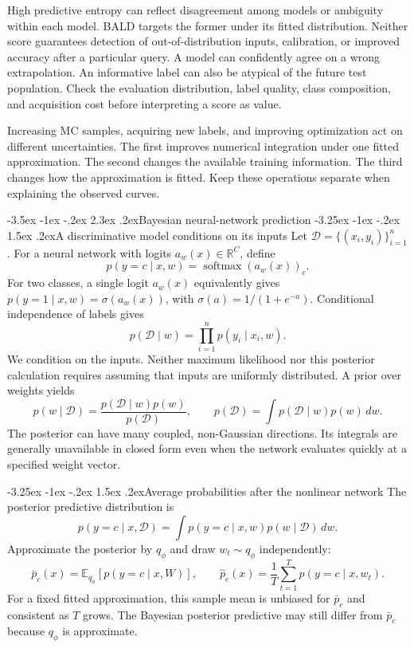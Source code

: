 \documentclass[11pt,a4paper]{article}
\makeatletter
\newcommand{\E}{\mathbb E}
\newcommand{\R}{\mathbb R}
\newcommand{\dd}{\,d}
\renewcommand\section{\@startsection{section}{1}{\z@}%
  {-3.5ex \@plus -1ex \@minus -.2ex}%
  {2.3ex \@plus .2ex}{\normalfont\Large}}
\renewcommand\subsection{\@startsection{subsection}{2}{\z@}%
  {-3.25ex \@plus -1ex \@minus -.2ex}%
  {1.5ex \@plus .2ex}{\normalfont\large}}
\makeatother
\begin{document}
High predictive entropy can reflect disagreement among models or ambiguity
within each model. BALD targets the former under its fitted distribution.
Neither score guarantees detection of out-of-distribution inputs, calibration,
or improved accuracy after a particular query. A model can confidently agree
on a wrong extrapolation. An informative label can also be atypical of the
future test population. Check the evaluation distribution, label quality,
class composition, and acquisition cost before interpreting a score as value.

Increasing MC samples, acquiring new labels, and improving optimization act
on different uncertainties. The first improves numerical integration under
one fitted approximation. The second changes the available training
information. The third changes how the approximation is fitted. Keep these
operations separate when explaining the observed curves.

\section{Bayesian neural-network prediction}
\subsection{A discriminative model conditions on its inputs}
Let $\mathcal D=\{(x_i,y_i)\}_{i=1}^n$. For a neural network with logits
$a_w(x)\in\R^C$, define
\[
 p(y=c\mid x,w)=\operatorname{softmax}(a_w(x))_c.
\]
For two classes, a single logit $a_w(x)$ equivalently gives
$p(y=1\mid x,w)=\sigma(a_w(x))$, with
$\sigma(a)=1/(1+e^{-a})$. Conditional independence of labels gives
\[
 p(\mathcal D\mid w)=\prod_{i=1}^n p(y_i\mid x_i,w).
\]
We condition on the inputs. Neither maximum likelihood nor this posterior
calculation requires assuming that inputs are uniformly distributed.
A prior over weights yields
\[
 p(w\mid\mathcal D)=\frac{p(\mathcal D\mid w)p(w)}{p(\mathcal D)},
 \qquad p(\mathcal D)=\int p(\mathcal D\mid w)p(w)\dd w.
\]
The posterior can have many coupled, non-Gaussian directions. Its integrals
are generally unavailable in closed form even when the network evaluates
quickly at a specified weight vector.

\subsection{Average probabilities after the nonlinear network}
The posterior predictive distribution is
\[
 p(y=c\mid x,\mathcal D)=\int p(y=c\mid x,w)p(w\mid\mathcal D)\dd w.
\]
Approximate the posterior by $q_\phi$ and draw $w_t\sim q_\phi$ independently:
\[
 \bar p_c(x)=\E_{q_\phi}[p(y=c\mid x,W)],\qquad
 \widehat p_c(x)=\frac1T\sum_{t=1}^T p(y=c\mid x,w_t).
\]
For a fixed fitted approximation, this sample mean is unbiased for $\bar p_c$
and consistent as $T$ grows. The Bayesian posterior predictive may still
differ from $\bar p_c$ because $q_\phi$ is approximate.
\end{document}
